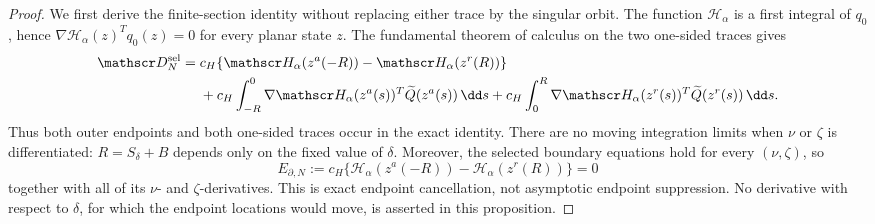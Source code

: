 \begin{proof}
We first derive the finite-section identity without replacing either trace
by the singular orbit.  The function \(\mathscr H_\alpha\) is a first
integral of \(q_0\), hence
\(\nabla\mathscr H_\alpha(z)^Tq_0(z)=0\) for every planar state \(z\).
The fundamental theorem of calculus on the two one-sided traces gives
\begin{align}
 \mathscr D_N^{\rm sel}
 ={}&c_H\{\mathscr H_\alpha(z^a(-R))
              -\mathscr H_\alpha(z^r(R))\}\notag\\
 &+c_H\int_{-R}^0
     \nabla\mathscr H_\alpha(z^a(s))^T
       \widetilde Q(z^a(s))\,\dd s
  +c_H\int_0^R
     \nabla\mathscr H_\alpha(z^r(s))^T
       \widetilde Q(z^r(s))\,\dd s.                 \label{eq:gap-finite-section-identity}
\end{align}
Thus both outer endpoints and both one-sided traces occur in the exact
identity.  There are no moving integration limits when \(\nu\) or
\(\zeta\) is differentiated: \(R=S_\delta+B\) depends only on the fixed
value of \(\delta\).  Moreover, the selected boundary equations hold for
every \((\nu,\zeta)\), so
\begin{equation}
 E_{\partial,N}:=c_H\{\mathscr H_\alpha(z^a(-R))
              -\mathscr H_\alpha(z^r(R))\}=0          \label{eq:gap-endpoint-error}
\end{equation}
together with all of its \(\nu\)- and \(\zeta\)-derivatives.  This is exact
endpoint cancellation, not asymptotic endpoint suppression.
No derivative with respect to \(\delta\), for which the endpoint locations
would move, is asserted in this proposition.


\end{proof}
